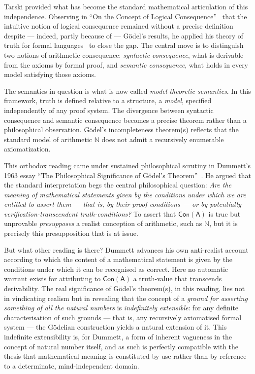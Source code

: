 \documentclass[reqno]{asl}
\newcommand{\pa}{\textsf{A}}
\newcommand{\Con}{\textsf{Con}}
\begin{document}
Tarski provided what has become the standard mathematical articulation of this independence. 
Observing in ``On the Concept of Logical Consequence''~\cite{tarski1936following_eng} that the 
intuitive notion of logical consequence remained without a precise definition despite --- indeed, 
partly because of --- G\"{o}del's results, he applied his theory of truth for formal 
languages~\cite{tarski1933truth_eng} to close the gap. The central move is to distinguish two notions 
of arithmetic consequence: \emph{syntactic consequence}, what is derivable from the axioms by formal 
proof, and \emph{semantic consequence}, what holds in every model satisfying those axioms. 

The semantics in question is what is now called \emph{model-theoretic semantics}. In this framework, truth is defined relative to a structure, a \emph{model}, specified independently of any proof system. 
The divergence between syntactic consequence and semantic consequence becomes a precise theorem rather than a philosophical 
observation. G\"odel's incompleteness theorem(s) reflects that the standard model of arithmetic $\mathbb{N}$
does not admit a recursively enumerable axiomatization.

This orthodox reading came under sustained philosophical scrutiny in
Dummett's 1963 essay ``The Philosophical Significance of G\"{o}del's
Theorem''~\cite{dummett1963}. He argued that the standard interpretation
begs the central philosophical question:
\textit{Are the meaning of mathematical statements given by the conditions under which we are entitled to assert them --- that is, by their proof-conditions --- or by potentially verification-transcendent truth-conditions?}
To assert that $\Con(\pa)$ is true but
unprovable \emph{presupposes} a realist conception of arithmetic, such as $\mathbb{N}$, but it is precisely this presupposition
that is at issue. 

But what other reading is there? Dummett advances his own anti-realist account according to which the content of a mathematical statement is given by the conditions under which it can be recognised as correct. Here no automatic warrant exists for attributing to $\Con(\pa)$ a truth-value that transcends derivability. The real significance of G\"{o}del's theorem(s), in this reading, lies not in vindicating realism but in revealing that the concept of a \emph{ground for asserting something of all the natural numbers} is \emph{indefinitely extensible}: for any definite characterisation of such grounds --- that is, any recursively axiomatised formal system --- the G\"{o}delian construction yields a natural extension of it. This indefinite extensibility is, for Dummett, a form of inherent vagueness in the concept of natural number itself, and as such is perfectly compatible with the thesis that mathematical meaning is constituted by use rather than by reference to a determinate, mind-independent domain.
\end{document}
